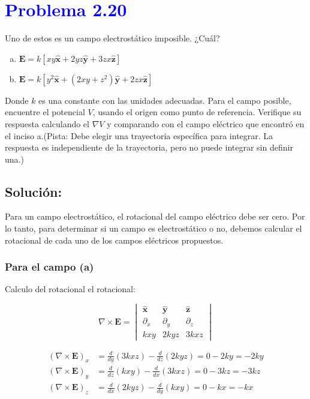 \documentclass[12pt]{article}
\newcommand{\question}[1]{\textcolor{blue}{\textbf{#1}}}
\begin{document}

\section*{\question{ Problema 2.20}} Uno de estos es un campo electrostático imposible. ¿Cuál?

\begin{enumerate}[(a)]
    \item  \(\mathbf{E} = k[xy \mathbf{ \hat{x}}+ 2yz\mathbf{ \hat{y}}+ 3zx\mathbf{ \hat{z}}] \)
    \item \(\mathbf{E} = k[y^2\mathbf{ \hat{x}}+ (2xy + z^2)\mathbf{ \hat{y}}+ 2zx\mathbf{ \hat{z}}] \)
\end{enumerate}

Donde \(k\)  es una constante con las unidades adecuadas. Para el campo posible, encuentre el potencial \(V\), usando el origen como punto de referencia. Verifique su respuesta calculando el \(\nabla V\) y comparando con el campo eléctrico que encontró en el inciso a.(Pista: Debe elegir una trayectoria específica para integrar. La respuesta es independiente de la trayectoria, pero no puede integrar sin definir una.)

\subsection*{Solución:}
Para un campo electrostático, el rotacional del campo eléctrico debe ser cero. Por lo tanto, para determinar si un campo es electrostático o no, debemos calcular el rotacional de cada uno de los campos eléctricos propuestos.

\subsubsection*{Para el campo (a)}

Calculo del rotacional el rotacional:

\[
\nabla \times \mathbf{E} = 
\begin{vmatrix}
\hat{\mathbf{x}} & \hat{\mathbf{y}} & \hat{\mathbf{z}} \\
\partial_x & \partial_y & \partial_z \\
kxy & 2k yz & 3k xz
\end{vmatrix}
\]

\begin{align*}
(\nabla \times \mathbf{E})_x &= \frac{d}{dy} (3kxz) - \frac{d}{dz} (2kyz) = 0 - 2ky = -2ky \\
(\nabla \times \mathbf{E})_y &= \frac{d}{dz} (kxy) - \frac{d}{dx} (3kxz) = 0 - 3kz = -3kz \\
(\nabla \times \mathbf{E})_z &= \frac{d}{dx} (2kyz) - \frac{d}{dy} (kxy) = 0 - kx = -kx
\end{align*}
\end{document}

